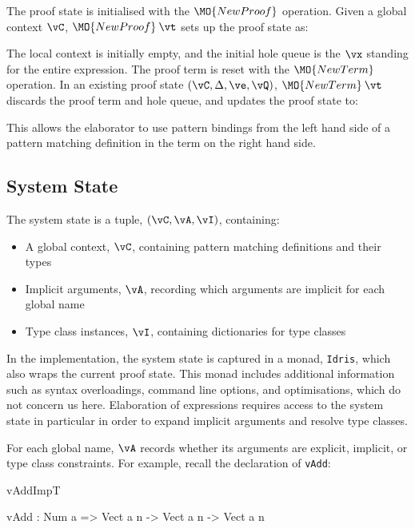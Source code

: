 The proof state is initialised with the $\MO{NewProof}$ operation. Given a
global context $\vC$, $\MO{NewProof}\:\vt$ sets up the proof state as:

\DM{
(\vC, \cdot, \hole{\vx}{\vt}\SC\vx, \langle\rangle, \langle\vx\rangle)
}

The local context is initially empty, and the initial hole queue is the $\vx$ standing for
the entire expression. The proof term is reset with the $\MO{NewTerm}$ operation.
In an existing proof state $(\vC, \Delta, \ve, \vQ)$,
$\MO{NewTerm}\:\vt$ discards the proof term and hole queue, and
updates the proof state to:

\DM{
(\vC, \Delta, \hole{\vx}{\vt}\SC\vx, \langle\rangle, \langle\vx\rangle)
}


This allows the elaborator to use pattern bindings from the left
hand side of a pattern matching definition in the term on the right hand side.

\subsection{System State}

\label{sect:sysstate}

The system state is a tuple, $(\vC,\vA,\vI)$, containing:

\begin{itemize}
\item A global context, $\vC$, containing pattern matching definitions and their types
\item Implicit arguments, $\vA$, recording which arguments are implicit for each global name
\item Type class instances, $\vI$, containing dictionaries for type classes
\end{itemize}

In the implementation, the system state is captured in a monad, \texttt{Idris}, 
which also wraps the current proof state. This monad 
includes additional information such as syntax overloadings,
command line options, and optimisations, which do not concern us here. Elaboration
of expressions requires access to the system state in particular in order to expand
implicit arguments and resolve type classes. 

For each global name, $\vA$ records whether its arguments are explicit, implicit,
or type class constraints.  For example, recall the declaration
of \texttt{vAdd}:

\begin{SaveVerbatim}{vAddImpT}

vAdd : Num a => Vect a n -> Vect a n -> Vect a n

\end{SaveVerbatim}

